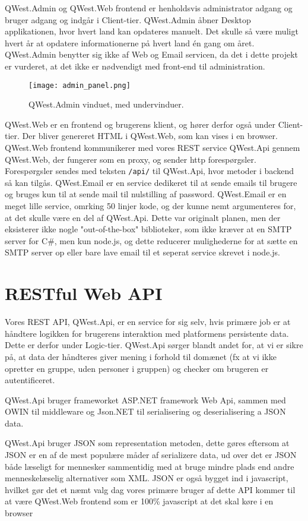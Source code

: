 QWest.Admin og QWest.Web frontend er henholdsvis administrator adgang og bruger adgang og indgår i Client-tier. QWest.Admin åbner Desktop applikationen, hvor hvert land kan opdateres manuelt. Det skulle så være muligt hvert år at opdatere informationerne på hvert land én gang om året. QWest.Admin benytter sig ikke af Web og Email servicen, da det i dette projekt er vurderet, at det ikke er nødvendigt med front-end til administration.

\begin{figure}
    \texttt{[image: admin\_panel.png]}
    \caption{QWest.Admin vinduet, med undervinduer.}
    \label{fig:admin_panel}
\end{figure}

QWest.Web er en frontend og brugerens klient, og hører derfor også under Client-tier. Der bliver genereret HTML i QWest.Web, som kan vises i en browser. QWest.Web frontend kommunikerer med vores REST service QWest.Api gennem QWest.Web, der fungerer som en proxy, og sender http forespørgsler. Forespørgsler sendes med teksten \texttt{/api/} til QWest.Api, hvor metoder i backend så kan tilgås. QWest.Email er en service dedikeret til at sende emails til brugere og bruges kun til at sende mail til nulstilling af password. QWest.Email er en meget lille service, omrking 50 linjer kode, og der kunne nemt argumenteres for, at det skulle være en del af QWest.Api. Dette var originalt planen, men der eksisterer ikke nogle "out-of-the-box" biblioteker, som ikke kræver at en SMTP server for C\#, men kun node.js, og dette reducerer mulighederne for at sætte en SMTP server op eller bare lave email til et seperat service skrevet i node.js.


\section{RESTful Web API}\label{sec:REST}
Vores REST API, QWest.Api, er en service for sig selv, hvis primære job er at håndtere logikken for brugerens interaktion med platformens persistente data. Dette er derfor under Logic-tier. QWest.Api sørger blandt andet for, at vi er sikre på, at data der håndteres giver mening i forhold til domænet (fx at vi ikke opretter en gruppe, uden personer i gruppen) og checker om brugeren er autentificeret.

QWest.Api bruger frameworket ASP.NET framework Web Api, sammen med OWIN\cite{Owin} til middleware og Json.NET til serialisering og deserialisering a JSON data.

QWest.Api bruger JSON\cite{json} som representation metoden, dette gøres eftersom at JSON er en af de mest populære måder af serializere data, ud over det er JSON både læseligt for mennesker sammentidig med at bruge mindre plads end andre menneskelæselig alternativer som XML. JSON er også bygget ind i javascript, hvilket gør det et næmt valg dag vores primære bruger af dette API kommer til at være QWest.Web frontend som er 100\% javascript at det skal køre i en browser

